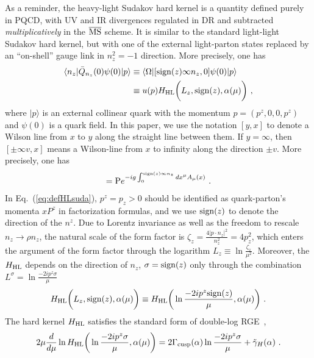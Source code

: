 \documentclass[a4paper,11pt]{article}
\begin{document}
As a reminder, the heavy-light Sudakov hard kernel is a quantity defined purely in PQCD, with UV and IR divergences regulated in DR and subtracted {\it multiplicatively} in the $\overline{\rm MS}$ scheme. It is similar to the standard light-light Sudakov hard kernel, but with one of the external light-parton states replaced by an ``on-shell'' gauge link in $n_z^2=-1$ direction. More precisely, one has 
\begin{align}\label{eq:defHLsuda}
\langle n_z|\bar Q_{n_z}(0)\psi(0)|p\rangle &\equiv \langle \Omega| [{\rm sign}(z)\infty n_z,0]\psi(0)|p\rangle \nonumber\\
&\equiv u(p)H_{\rm HL}\bigg(L_z,{\rm sign}(z),\alpha(\mu)\bigg) \ ,
\end{align}
where $|p\rangle$ is an external collinear quark with the momentum $p=(p^z,0,0,p^z)$ and $\psi(0)$ is a quark field. In this paper, we use the notation $[y,x]$ to denote a Wilson line from $x$ to $y$ along the straight line between them. If $y=\infty$, then $[ \pm \infty v,x]$ means a Wilson-line from $x$ to infinity along the direction $ \pm v$. More precisely, one has
\begin{align}
[{\rm sign}(z)\infty n_z ,0]={\rm P}e^{-i g \int_{0}^{{\rm sign}(z) \infty n_z } d x^{\mu} A_{\mu}(x)} \ .
\end{align}
In Eq.~(\ref{eq:defHLsuda}), $p^z=p_z>0$ should be identified as quark-parton's momenta $xP^z$ in factorization formulas, and we use ${\rm sign}(z)$ to denote the direction of the $n^z$. Due to Lorentz invariance as well as the freedom to rescale $n_z \rightarrow \rho n_z$, the natural scale of the form factor is $\zeta_z=\frac{4|p\cdot n_z|^2}{n_z^2}=4 p_z^2$, which enters the argument of the form factor through the logarithm $L_z \equiv \ln \frac{\zeta_z}{\mu^2}$.  Moreover, the $H_{\rm HL}$ depends on the direction of $n_z$, $\sigma={\rm sign}(z)$ only through the combination $L^{\sigma}=\ln \frac{-2ip^z\sigma}{\mu}$
\begin{align}
H_{\rm HL}\bigg(L_z,{\rm sign}(z),\alpha(\mu)\bigg) \equiv H_{\rm HL}\bigg(\ln \frac{-2i p^z{\rm sign}(z) }{\mu},\alpha(\mu)\bigg) \ .
\end{align}
The hard kernel $H_{\rm HL}$ satisfies the standard form of double-log RGE~\cite{Ji:2019ewn,Ji:2021znw,Ji:2023pba}, \begin{align}\label{eq:RGEHLsuda}
2\mu\frac{d}{d\mu} \ln H_{\rm HL}\bigg(\ln \frac{-2i p^z\sigma }{\mu},\alpha(\mu)\bigg)=2\Gamma_{\rm cusp}(\alpha) \ln \frac{-2i p^z \sigma}{\mu} +\tilde {\gamma}_{H}(\alpha) \ .
\end{align}
\end{document}
